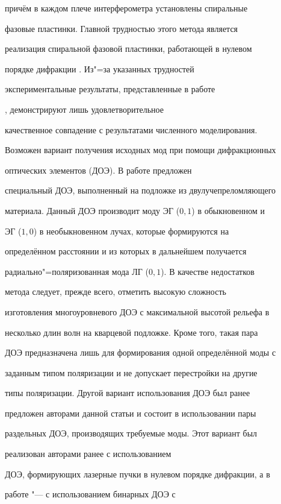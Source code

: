 причём в каждом плече интерферометра установлены спиральные

фазовые пластинки. Главной трудностью этого метода является

реализация спиральной фазовой пластинки, работающей в нулевом

порядке дифракции \cite{karpeev:bib5}. Из"=за указанных трудностей

экспериментальные результаты, представленные в работе

\cite{karpeev:bib4}, демонстрируют лишь удовлетворительное

качественное совпадение с результатами численного моделирования.



Возможен вариант получения исходных мод при помощи дифракционных

оптических элементов (ДОЭ). В работе \cite{karpeev:bib6} предложен

специальный ДОЭ, выполненный на подложке из двулучепреломляющего

материала. Данный ДОЭ производит моду ЭГ ($0,1$) в обыкновенном и

ЭГ ($1,0$) в необыкновенном лучах, которые формируются на

определённом расстоянии и из которых в дальнейшем получается

радиально"=поляризованная мода ЛГ ($0,1$). В качестве недостатков

метода следует, прежде всего, отметить высокую сложность

изготовления многоуровневого ДОЭ с максимальной высотой рельефа в

несколько длин волн на кварцевой подложке. Кроме того, такая пара

ДОЭ предназначена лишь для формирования одной определённой моды с

заданным типом поляризации и не допускает перестройки на другие

типы поляризации. Другой вариант использования ДОЭ был ранее

предложен авторами данной статьи и состоит в использовании пары

раздельных ДОЭ, производящих требуемые моды. Этот вариант был

реализован авторами ранее \cite{karpeev:bib7} с использованием

ДОЭ, формирующих лазерные пучки в нулевом порядке дифракции, а в

работе \cite{karpeev:bib8} "--- с использованием бинарных ДОЭ с

